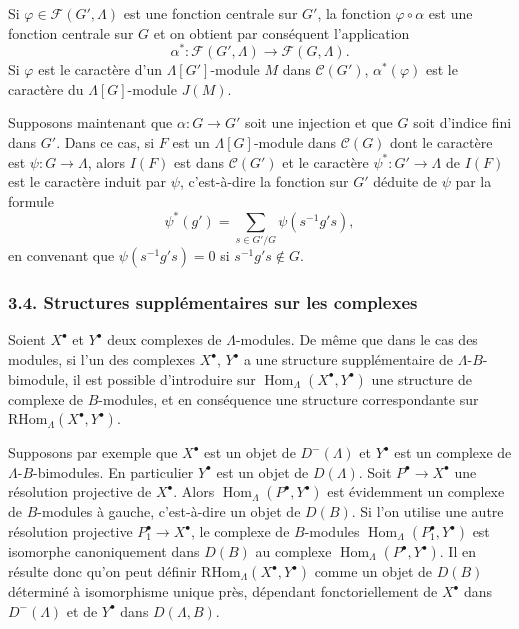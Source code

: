 \documentclass[11pt]{article}
\DeclareMathOperator{\Hom}{Hom}
\providecommand{\RHom}{\mathrm{RHom}}
\providecommand{\RHom}{\mathrm{RHom}}
\providecommand{\Hom}{\operatorname{Hom}}
\providecommand{\RHom}{\mathrm R\mathcal{H}om}
\providecommand{\RHom}{\mathrm{RHom}}
\providecommand{\Hom}{\operatorname{Hom}}
\begin{document}
Si $\varphi\in\mathcal F(G',\Lambda)$ est une fonction centrale sur $G'$, la fonction $\varphi\circ\alpha$ est une fonction centrale sur $G$ et on obtient par conséquent l'application
\[
\alpha^*: \mathcal F(G',\Lambda)\longrightarrow\mathcal F(G,\Lambda).
\]
Si $\varphi$ est le caractère d'un $\Lambda[G']$-module $M$ dans $\mathcal C(G')$, $\alpha^*(\varphi)$ est le caractère du $\Lambda[G]$-module $J(M)$.

Supposons maintenant que $\alpha:G\to G'$ soit une injection et que $G$ soit d'indice fini dans $G'$. Dans ce cas, si $F$ est un $\Lambda[G]$-module dans $\mathcal C(G)$ dont le caractère est $\psi:G\to\Lambda$, alors $I(F)$ est dans $\mathcal C(G')$ et le caractère $\psi^*:G'\to\Lambda$ de $I(F)$ est le caractère induit par $\psi$, c'est-à-dire la fonction sur $G'$ déduite de $\psi$ par la formule
\[
\psi^*(g')=\sum_{s\in G'/G}\psi(s^{-1}g's),
\tag{3.3.1}
\]
en convenant que $\psi(s^{-1}g's)=0$ si $s^{-1}g's\notin G$.

\subsubsection*{3.4. Structures supplémentaires sur les complexes}

Soient $X^\bullet$ et $Y^\bullet$ deux complexes de $\Lambda$-modules. De même que dans le cas des modules, si l'un des complexes $X^\bullet$, $Y^\bullet$ a une structure supplémentaire de $\Lambda$-$B$-bimodule, il est possible d'introduire sur $\Hom_{\Lambda}(X^\bullet,Y^\bullet)$ une structure de complexe de $B$-modules, et en conséquence une structure correspondante sur $\RHom_{\Lambda}(X^\bullet,Y^\bullet)$.

Supposons par exemple que $X^\bullet$ est un objet de $D^-(\Lambda)$ et $Y^\bullet$ est un complexe de $\Lambda$-$B$-bimodules. En particulier $Y^\bullet$ est un objet de $D(\Lambda)$. Soit $P^\bullet\to X^\bullet$ une résolution projective de $X^\bullet$. Alors $\Hom_{\Lambda}(P^\bullet,Y^\bullet)$ est évidemment un complexe de $B$-modules à gauche, c'est-à-dire un objet de $D(B)$. Si l'on utilise une autre résolution projective $P_1^\bullet\to X^\bullet$, le complexe de $B$-modules $\Hom_{\Lambda}(P_1^\bullet,Y^\bullet)$ est isomorphe canoniquement dans $D(B)$ au complexe $\Hom_{\Lambda}(P^\bullet,Y^\bullet)$. Il en résulte donc qu'on peut définir $\RHom_{\Lambda}(X^\bullet,Y^\bullet)$ comme un objet de $D(B)$ déterminé à isomorphisme unique près, dépendant fonctoriellement de $X^\bullet$ dans $D^-(\Lambda)$ et de $Y^\bullet$ dans $D(\Lambda,B)$.
\end{document}
